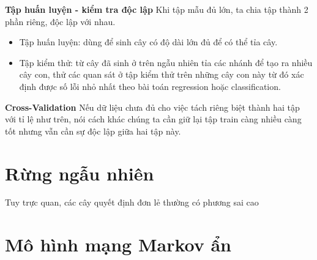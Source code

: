\textbf{Tập huấn luyện - kiểm tra độc lập}
Khi tập mẫu đủ lớn, ta chia tập thành 2 phần riêng, độc lập với nhau.
\begin{itemize}
\item Tập huấn luyện: dùng để sinh cây có độ dài lớn đủ để có thể tỉa cây.
\item Tập kiểm thử: từ cây đã sinh ở trên ngẫu nhiên tỉa các nhánh để tạo ra nhiều cây con, thử các quan sát ở tập kiểm thử trên những cây con này từ đó xác định được số lỗi nhỏ nhất theo bài toán regression hoặc classification.
\end{itemize}
\textbf{Cross-Validation}
Nếu dữ liệu chưa đủ cho việc tách riêng biệt thành hai tập với tỉ lệ như trên, nói cách khác chúng ta cần giữ lại tập train càng nhiều càng tốt nhưng vẫn cần sự độc lập giữa hai tập này.
\section{Rừng ngẫu nhiên}
Tuy trực quan, các cây quyết định đơn lẻ thường có phương sai cao 



\section{Mô hình mạng Markov ẩn} 
